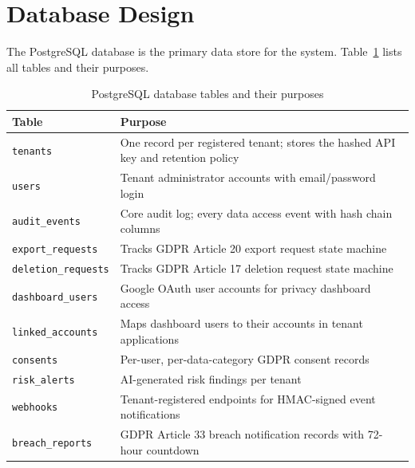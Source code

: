 \documentclass[a4paper,12pt,onecolumn]{report}
\begin{document}
\section{Database Design}

The PostgreSQL database is the primary data store for the system.
Table~\ref{tab:schema} lists all tables and their purposes.

\begin{table}[h]
    \begin{center}
        \begin{tabularx}{\textwidth}{|l|X|}
            \hline
            \textbf{Table} & \textbf{Purpose} \\
            \hline
            \texttt{tenants} & One record per registered tenant; stores the hashed API key and retention policy \\
            \hline
            \texttt{users} & Tenant administrator accounts with email/password login \\
            \hline
            \texttt{audit\_events} & Core audit log; every data access event with hash chain columns \\
            \hline
            \texttt{export\_requests} & Tracks GDPR Article 20 export request state machine \\
            \hline
            \texttt{deletion\_requests} & Tracks GDPR Article 17 deletion request state machine \\
            \hline
            \texttt{dashboard\_users} & Google OAuth user accounts for privacy dashboard access \\
            \hline
            \texttt{linked\_accounts} & Maps dashboard users to their accounts in tenant applications \\
            \hline
            \texttt{consents} & Per-user, per-data-category GDPR consent records \\
            \hline
            \texttt{risk\_alerts} & AI-generated risk findings per tenant \\
            \hline
            \texttt{webhooks} & Tenant-registered endpoints for HMAC-signed event notifications \\
            \hline
            \texttt{breach\_reports} & GDPR Article 33 breach notification records with 72-hour countdown \\
            \hline
        \end{tabularx}
    \end{center}
    \caption{PostgreSQL database tables and their purposes}
    \label{tab:schema}
\end{table}
\end{document}
